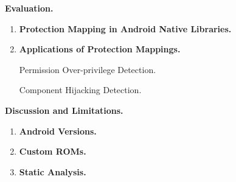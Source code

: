 \textbf{Evaluation.}

\begin{enumerate}
    \item \textbf{Protection Mapping in Android Native Libraries.} 

    \item \textbf{Applications of Protection Mappings.} 
    
    Permission Over-privilege Detection. 

    Component Hijacking Detection. 

\end{enumerate}

\textbf{Discussion and Limitations.}

\begin{enumerate}
    \item \textbf{Android Versions.} 

    \item \textbf{Custom ROMs.} 

    \item \textbf{Static Analysis.} 

\end{enumerate}

% 





